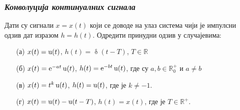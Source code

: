 \subsubsection{\textit{Конволуција континуалних сигнала}}
\PID
Дати су сигнали 
$x = x(t)$ који се доводе на улаз система чији је импулсни одзив 
дат изразом $h = h(t)$. Одредити принудни одзив у случајевима:
\begin{enumerate}
\item[(а)] $x(t) = {\rm u}(t)$, $h(t) = {\updelta}(t - T)$, 
$T \in \mathbb R$
\item[(б)] $x(t) = {\rm e}^{-at} \,{\rm u}(t)$, 
$h(t) = {\rm e}^{-bt}\,{\rm u}(t)$, где су 
$a,b\in\mathbb R^+_0$  и 
$a \neq b$
\item[(в)] $x(t) = {t}^{k} \,{\rm u}(t)$,
$h(t) = {\rm u}(t)$, где је $k \neq -1$.
\item[(г)] $x(t) = {\rm u}(t) - {\rm u}(t-T)$,
$h(t) = x(t)$, где је $T \in \mathbb R^+$.
\end{enumerate}

